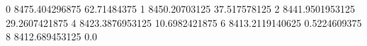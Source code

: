 0 8475.404296875 62.71484375
1 8450.20703125 37.517578125
2 8441.9501953125 29.2607421875
4 8423.3876953125 10.6982421875
6 8413.2119140625 0.5224609375
8 8412.689453125 0.0
